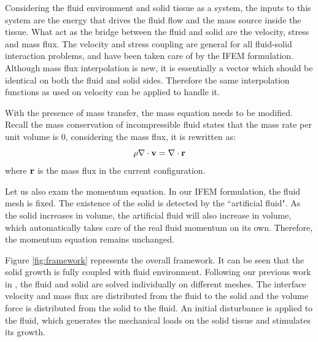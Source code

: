 
Considering the fluid environment and solid tissue as a system, the inputs to this system are the energy that drives the fluid flow and the mass source inside the tissue. What act as the bridge between the fluid and solid are the velocity, stress and mass flux. The velocity and stress coupling are general for all fluid-solid interaction problems, and have been taken care of by the IFEM formulation. Although mass flux interpolation is new, it is essentially a vector which should be identical on both the fluid and solid sides. Therefore the same interpolation functions as used on velocity can be applied to handle it.

With the presence of mass transfer, the mass equation needs to be modified. Recall the mass conservation of incompressible fluid states that the mass rate per unit volume is $0$, considering the mass flux, it is rewritten as:
\begin{equation}
\rho \nabla \cdot \bold{v} = \nabla \cdot \bold{r}
\end{equation}
where $\bold{r}$ is the mass flux in the current configuration. 

Let us also exam the momentum equation. In our IFEM formulation, the fluid mesh is fixed. The existence of the solid is detected by the ``artificial fluid". As the solid increases in volume, the artificial fluid will also increase in volume, which automatically takes care of the real fluid momentum on its own. Therefore, the momentum equation remains unchanged.



Figure \ref{fig:framework} represents the overall framework. It can be seen that the solid growth is fully coupled with fluid environment. Following our previous work in \cite{Zhang, Zhang3, Zhang16, Zhang17}, the fluid and solid are solved individually on different meshes. The interface velocity and mass flux are distributed from the fluid to the solid and the volume force is distributed from the solid to the fluid. An initial disturbance is applied to the fluid, which generates the mechanical loads on the solid tissue and stimulates its growth.

